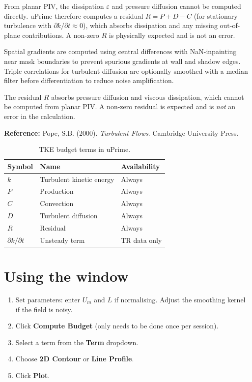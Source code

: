 \documentclass[11pt, a4paper]{report}
\newcommand{\uipth}[1]{\textbf{\textcolor{upblue}{#1}}}
\newcommand{\software}[1]{\textsf{#1}}
\begin{document}
From planar PIV, the dissipation $\varepsilon$ and pressure diffusion cannot be computed directly. \software{uPrime} therefore computes a residual $R = P + D - C$ (for stationary turbulence with $\partial k/\partial t \approx 0$), which absorbs dissipation and any missing out-of-plane contributions. A non-zero $R$ is physically expected and is not an error.

Spatial gradients are computed using central differences with NaN-inpainting near mask boundaries to prevent spurious gradients at wall and shadow edges. Triple correlations for turbulent diffusion are optionally smoothed with a median filter before differentiation to reduce noise amplification.

\begin{notebox}
The residual $R$ absorbs pressure diffusion and viscous dissipation, which cannot be computed from planar PIV. A non-zero residual is expected and is \emph{not} an error in the calculation.
\end{notebox}

\noindent\textbf{Reference:} Pope, S.B. (2000). \textit{Turbulent Flows}. Cambridge University Press.

\begin{table}[htbp]
\centering
\caption{TKE budget terms in \software{uPrime}.}
\begin{tabular}{lll}
\toprule
\textbf{Symbol} & \textbf{Name} & \textbf{Availability} \\
\midrule
$k$                     & Turbulent kinetic energy  & Always \\
$P$                     & Production                & Always \\
$C$                     & Convection                & Always \\
$D$                     & Turbulent diffusion       & Always \\
$R$                     & Residual                  & Always \\
$\partial k/\partial t$ & Unsteady term             & TR data only \\
\bottomrule
\end{tabular}
\end{table}

\section{Using the window}

\begin{stepbox}
\begin{enumerate}[leftmargin=1.5em, topsep=2pt]
  \item Set parameters: enter $U_m$ and $L$ if normalising. Adjust the smoothing kernel if the field is noisy.
  \item Click \uipth{Compute Budget} (only needs to be done once per session).
  \item Select a term from the \uipth{Term} dropdown.
  \item Choose \uipth{2D Contour} or \uipth{Line Profile}.
  \item Click \uipth{Plot}.
\end{enumerate}
\end{stepbox}
\end{document}
